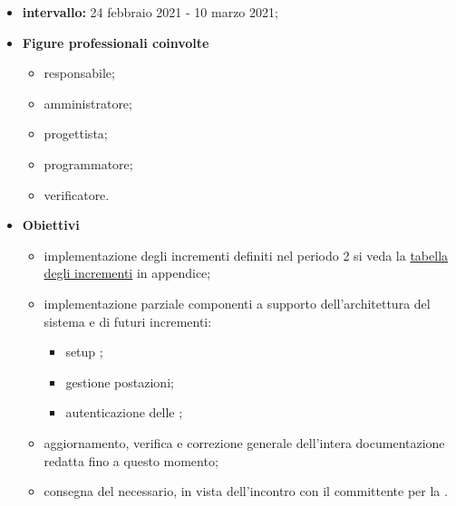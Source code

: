                 \begin{itemize}
                    \item \textbf{intervallo: }24 febbraio 2021 - 10 marzo 2021;
                
                \item  \textbf{Figure professionali coinvolte}
                    \begin{itemize}
                        \item responsabile;
                        \item amministratore;
                        \item progettista;
                        \item programmatore;
                        \item verificatore.
                    \end{itemize}
        
                    \item \textbf{Obiettivi}

                                \begin{itemize}
                                    \item implementazione degli incrementi definiti nel periodo 2 si veda la\hypersetup{
                                        linkcolor=blue
                                    }
                                    \hyperlink{TabellaIncrementi}{tabella degli incrementi} in appendice;
                                    \hypersetup{
                                        linkcolor=black
                                    }
                                    \item implementazione parziale componenti a supporto dell'architettura del sistema e di futuri incrementi:
                                            \begin{itemize}
                                                \item setup ;
                                                \item {} gestione postazioni;
                                                \item autenticazione delle ;
                                            \end{itemize}
                                    \item aggiornamento, verifica e correzione generale dell'intera documentazione redatta fino a questo momento;
                                    \item consegna del  necessario, in vista dell'incontro con il committente per la \RP{}.
                                \end{itemize}
                    \end{itemize}
            
